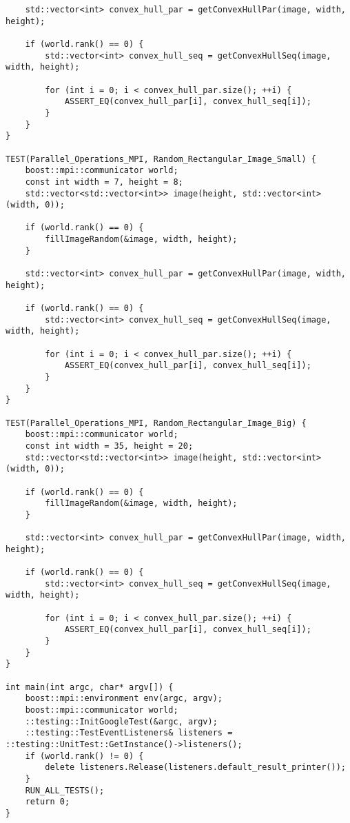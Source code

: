 \begin{verbatim}
	std::vector<int> convex_hull_par = getConvexHullPar(image, width, height);
	
	if (world.rank() == 0) {
		std::vector<int> convex_hull_seq = getConvexHullSeq(image, width, height);
		
		for (int i = 0; i < convex_hull_par.size(); ++i) {
			ASSERT_EQ(convex_hull_par[i], convex_hull_seq[i]);
		}
	}
}

TEST(Parallel_Operations_MPI, Random_Rectangular_Image_Small) {
	boost::mpi::communicator world;
	const int width = 7, height = 8;
	std::vector<std::vector<int>> image(height, std::vector<int>(width, 0));
	
	if (world.rank() == 0) {
		fillImageRandom(&image, width, height);
	}
	
	std::vector<int> convex_hull_par = getConvexHullPar(image, width, height);
	
	if (world.rank() == 0) {
		std::vector<int> convex_hull_seq = getConvexHullSeq(image, width, height);
		
		for (int i = 0; i < convex_hull_par.size(); ++i) {
			ASSERT_EQ(convex_hull_par[i], convex_hull_seq[i]);
		}
	}
}

TEST(Parallel_Operations_MPI, Random_Rectangular_Image_Big) {
	boost::mpi::communicator world;
	const int width = 35, height = 20;
	std::vector<std::vector<int>> image(height, std::vector<int>(width, 0));
	
	if (world.rank() == 0) {
		fillImageRandom(&image, width, height);
	}
	
	std::vector<int> convex_hull_par = getConvexHullPar(image, width, height);
	
	if (world.rank() == 0) {
		std::vector<int> convex_hull_seq = getConvexHullSeq(image, width, height);
		
		for (int i = 0; i < convex_hull_par.size(); ++i) {
			ASSERT_EQ(convex_hull_par[i], convex_hull_seq[i]);
		}
	}
}

int main(int argc, char* argv[]) {
	boost::mpi::environment env(argc, argv);
	boost::mpi::communicator world;
	::testing::InitGoogleTest(&argc, argv);
	::testing::TestEventListeners& listeners = ::testing::UnitTest::GetInstance()->listeners();
	if (world.rank() != 0) {
		delete listeners.Release(listeners.default_result_printer());
	}
	RUN_ALL_TESTS();
	return 0;
}
\end{verbatim}